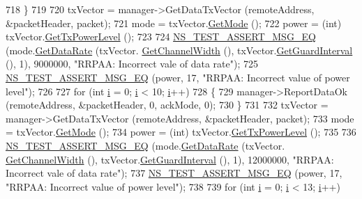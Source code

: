 \begin{DoxyCode}
718     \}
719 
720   txVector = manager->GetDataTxVector (remoteAddress, &packetHeader, packet);
721   mode = txVector.\hyperlink{classns3_1_1WifiTxVector_a497b1f11cad4b8b26251dfa07c9ad1d6}{GetMode} ();
722   power = (int) txVector.\hyperlink{classns3_1_1WifiTxVector_a7c98bd9609ff1c5cefa6e22d6908a2fe}{GetTxPowerLevel} ();
723 
724   \hyperlink{group__testing_ga2a9d78cffb3db8e867c35fff0b698cf5}{NS\_TEST\_ASSERT\_MSG\_EQ} (mode.\hyperlink{classns3_1_1WifiMode_adcfbe150f69da720db23387f733b8a52}{GetDataRate} (txVector.
      \hyperlink{classns3_1_1WifiTxVector_a1f8bfa51778a3e217581eb665f059564}{GetChannelWidth} (), txVector.\hyperlink{classns3_1_1WifiTxVector_ab80c0fd812542ef337a6cace4f64db63}{GetGuardInterval} (), 1), 9000000, \textcolor{stringliteral}{"RRPAA:
       Incorrect vale of data rate"});
725   \hyperlink{group__testing_ga2a9d78cffb3db8e867c35fff0b698cf5}{NS\_TEST\_ASSERT\_MSG\_EQ} (power, 17, \textcolor{stringliteral}{"RRPAA: Incorrect value of power level"});
726 
727   \textcolor{keywordflow}{for} (\textcolor{keywordtype}{int} \hyperlink{bernuolliDistribution_8m_a6f6ccfcf58b31cb6412107d9d5281426}{i} = 0; \hyperlink{bernuolliDistribution_8m_a6f6ccfcf58b31cb6412107d9d5281426}{i} < 10; \hyperlink{bernuolliDistribution_8m_a6f6ccfcf58b31cb6412107d9d5281426}{i}++)
728     \{
729       manager->ReportDataOk (remoteAddress, &packetHeader, 0, ackMode, 0);
730     \}
731 
732   txVector = manager->GetDataTxVector (remoteAddress, &packetHeader, packet);
733   mode = txVector.\hyperlink{classns3_1_1WifiTxVector_a497b1f11cad4b8b26251dfa07c9ad1d6}{GetMode} ();
734   power = (int) txVector.\hyperlink{classns3_1_1WifiTxVector_a7c98bd9609ff1c5cefa6e22d6908a2fe}{GetTxPowerLevel} ();
735 
736   \hyperlink{group__testing_ga2a9d78cffb3db8e867c35fff0b698cf5}{NS\_TEST\_ASSERT\_MSG\_EQ} (mode.\hyperlink{classns3_1_1WifiMode_adcfbe150f69da720db23387f733b8a52}{GetDataRate} (txVector.
      \hyperlink{classns3_1_1WifiTxVector_a1f8bfa51778a3e217581eb665f059564}{GetChannelWidth} (), txVector.\hyperlink{classns3_1_1WifiTxVector_ab80c0fd812542ef337a6cace4f64db63}{GetGuardInterval} (), 1), 12000000, \textcolor{stringliteral}{"RRPAA:
       Incorrect vale of data rate"});
737   \hyperlink{group__testing_ga2a9d78cffb3db8e867c35fff0b698cf5}{NS\_TEST\_ASSERT\_MSG\_EQ} (power, 17, \textcolor{stringliteral}{"RRPAA: Incorrect value of power level"});
738 
739   \textcolor{keywordflow}{for} (\textcolor{keywordtype}{int} \hyperlink{bernuolliDistribution_8m_a6f6ccfcf58b31cb6412107d9d5281426}{i} = 0; \hyperlink{bernuolliDistribution_8m_a6f6ccfcf58b31cb6412107d9d5281426}{i} < 13; \hyperlink{bernuolliDistribution_8m_a6f6ccfcf58b31cb6412107d9d5281426}{i}++)

\end{DoxyCode}
